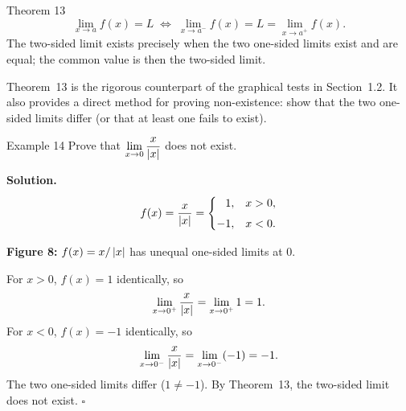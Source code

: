 \begin{theorembox}{Theorem 13}
\[
\lim_{x \to a} f(x) = L
\;\iff\;
\lim_{x \to a^{-}} f(x) = L = \lim_{x \to a^{+}} f(x).
\]
The two-sided limit exists precisely when the two one-sided limits exist and are equal; the common value is then the two-sided limit.
\end{theorembox}

\noindent
Theorem~13 is the rigorous counterpart of the graphical tests in Section~1.2. It also provides a direct method for proving non-existence: show that the two one-sided limits differ (or that at least one fails to exist).

\begin{examplebox}{Example 14}
Prove that \(\displaystyle\lim_{x \to 0} \frac{x}{\left|x\right|}\) does not exist.

\medskip
\textbf{Solution.}
\[
f(x) = \frac{x}{\left|x\right|} =
\begin{cases}
\phantom{-}1, & x > 0, \\[4pt]
-1, & x < 0.
\end{cases}
\]

\begin{center}

\smallskip
\textbf{Figure 8:} \(f(x) = x/\left|x\right|\) has unequal one-sided limits at \(0\).
\end{center}

For \(x > 0\), \(f(x) = 1\) identically, so
\[
\lim_{x \to 0^{+}} \frac{x}{\left|x\right|} = \lim_{x \to 0^{+}} 1 = 1.
\]
For \(x < 0\), \(f(x) = -1\) identically, so
\[
\lim_{x \to 0^{-}} \frac{x}{\left|x\right|} = \lim_{x \to 0^{-}} (-1) = -1.
\]
The two one-sided limits differ (\(1 \neq -1\)). By Theorem~13, the two-sided limit does not exist. \(\square\)
\end{examplebox}

